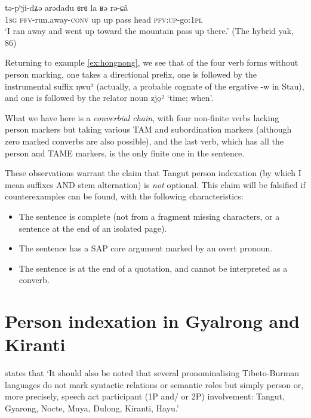 \documentclass[oldfontcommands,oneside,a4paper,11pt]{article}
\newcommand{\ipa}[1]{{\phon \mbox{#1}}} %
\begin{document}
\begin{exe}
\ex \label{tEphjidZE}
\gll \ipa{ŋa} 	\ipa{tə-pʰji-dʑə} 	\ipa{arədadu} 	\ipa{ɞrɞ} 	\ipa{la} 	\ipa{ʁə} 	\ipa{rə-ɕã} \\
 \textsc{1sg} \textsc{pfv}-run.away-\textsc{conv} up up pass head \textsc{pfv:up}-go:\textsc{1pl} \\
\glt `I ran away and went up toward the mountain pass up there.' (The hybrid yak, 86) 
\end{exe}

Returning to example \ref{ex:hongnong}, we see that of the four verb forms without person marking, one takes a directional prefix, one is followed by the instrumental suffix  \ipa{ŋwu²} (actually, a probable cognate of the ergative \ipa{-w} in Stau), and one is followed by the relator noun  \ipa{zjọ²} `time; when'. 

What we have here is a \textit{converbial chain}, with four non-finite verbs lacking person markers but taking various TAM and subordination markers (although zero marked converbs are also possible), and the last verb, which has all the person and TAME markers, is the only finite one in the sentence.

These observations warrant the claim that Tangut person indexation (by which I mean suffixes AND stem alternation) is \textit{not} optional. This claim will be falsified if counterexamples can be found, with the following characteristics:

\begin{itemize}
\item The sentence is complete (not from a fragment missing characters, or a sentence at the end of an isolated page).
\item The sentence has a SAP core argument marked by an overt pronoun.
\item The sentence is at the end of a quotation, and cannot be interpreted as a converb.
\end{itemize}

\section{Person indexation in Gyalrong and Kiranti} \label{sec:rgyalrong}
\citet[53]{zeisler15eat} states that `It should also be noted that several pronominalising Tibeto-Burman languages do not mark syntactic relations or semantic roles but simply person or, more precisely, speech act participant (1P and/ or 2P) involvement: Tangut, Gyarong, Nocte, Muya, Dulong, Kiranti, Hayu.' 
\end{document}

